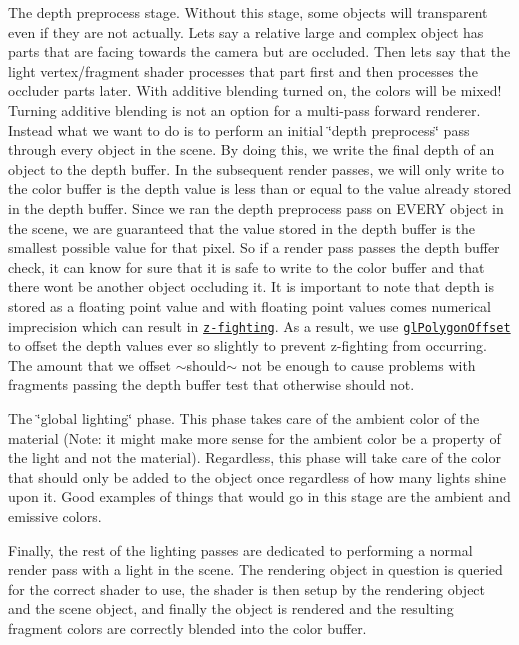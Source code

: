 \begin{DoxyEnumerate}
\item The depth preprocess stage. Without this stage, some objects will transparent even if they are not actually. Let\textquotesingle{}s say a relative large and complex object has parts that are facing towards the camera but are occluded. Then let\textquotesingle{}s say that the light vertex/fragment shader processes that part first and then processes the occluder parts later. With additive blending turned on, the colors will be mixed! Turning additive blending is not an option for a multi-\/pass forward renderer. Instead what we want to do is to perform an initial \char`\"{}depth preprocess\char`\"{} pass through every object in the scene. By doing this, we write the final depth of an object to the depth buffer. In the subsequent render passes, we will only write to the color buffer is the depth value is less than or equal to the value already stored in the depth buffer. Since we ran the depth preprocess pass on E\+V\+E\+R\+Y object in the scene, we are guaranteed that the value stored in the depth buffer is the smallest possible value for that pixel. So if a render pass passes the depth buffer check, it can know for sure that it is safe to write to the color buffer and that there won\textquotesingle{}t be another object occluding it. It is important to note that depth is stored as a floating point value and with floating point values comes numerical imprecision which can result in \href{https://en.wikipedia.org/wiki/Z-fighting}{\tt z-\/fighting}. As a result, we use \href{https://www.opengl.org/sdk/docs/man/html/glPolygonOffset.xhtml}{\tt gl\+Polygon\+Offset} to offset the depth values ever so slightly to prevent z-\/fighting from occurring. The amount that we offset $\sim$should$\sim$ not be enough to cause problems with fragments passing the depth buffer test that otherwise should not.
\item The \char`\"{}global lighting\char`\"{} phase. This phase takes care of the ambient color of the material (Note\+: it might make more sense for the ambient color be a property of the light and not the material). Regardless, this phase will take care of the color that should only be added to the object once regardless of how many lights shine upon it. Good examples of things that would go in this stage are the ambient and emissive colors.
\item Finally, the rest of the lighting passes are dedicated to performing a normal render pass with a light in the scene. The rendering object in question is queried for the correct shader to use, the shader is then setup by the rendering object and the scene object, and finally the object is rendered and the resulting fragment colors are correctly blended into the color buffer.
\end{DoxyEnumerate}

